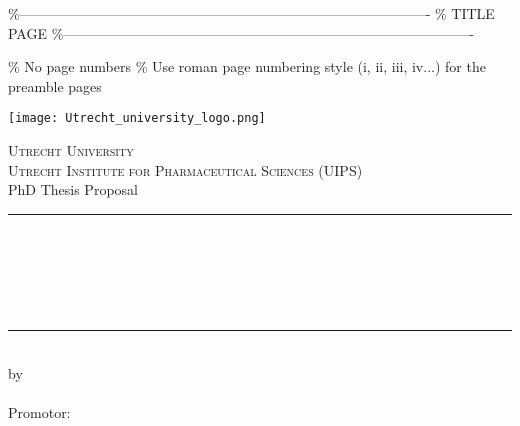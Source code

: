 \%----------------------------------------------------------------------------------------
\%	TITLE PAGE
\%----------------------------------------------------------------------------------------

\pagestyle{empty} \% No page numbers
\frontmatter \% Use roman page numbering style (i, ii, iii, iv...) for the preamble pages

\begin{titlepage}
\begin{center}
    \texttt{[image: Utrecht\_university\_logo.png]}

{\large \scshape Utrecht University\\Utrecht Institute for Pharmaceutical Sciences (UIPS)}\\[1.4cm]
{\Large PhD Thesis Proposal}\\[0.5cm]
\rule{\textwidth}{1.5pt}\\[0cm]
{\huge \bfseries \thesistitle \par \ }\\[-0.5cm]
\rule{\textwidth}{1.5pt}\\[2.5cm]
\hfill  by\\[1cm]
\hfill  {\large \bfseries\name}\\
\vfill
{\hfill \large Promotor: \textbf{\Promotor}} \\ 
\vspace{1cm}
\hfill  \submissiondate
\end{center}
\end{titlepage}